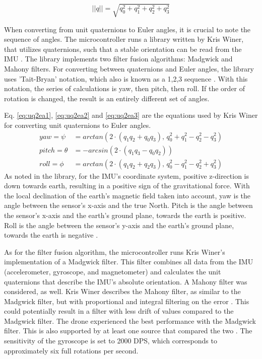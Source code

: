 \begin{equation} \label{eq:normquaternion}
    ||q|| = \sqrt{q_0^2 + q_1^2 + q_2^2 + q_3^2}
\end{equation}

When converting from unit quaternions to Euler angles, it is crucial to note the sequence of angles. The microcontroller runs a library written by Kris Winer, that utilizes quaternions, such that a stable orientation can be read from the IMU \cite{kriswinermpu9250}. The library implements two filter fusion algorithms: Madgwick and Mahony filters. For converting between quaternions and Euler angles, the library uses 'Tait-Bryan' notation, which also is known as a 1,2,3 sequence \cite{JamesDiebelQuaternions}.
With this notation, the series of calculations is yaw, then pitch, then roll. If the order of rotation is changed, the result is an entirely different set of angles. 

Eq. \ref{eq:uq2ea1}, \ref{eq:uq2ea2} and \ref{eq:uq2ea3} are the equations used by Kris Winer for converting unit quaternions to Euler angles. 
\begin{align} \label{eq:uq2ea1}
      yaw = \psi &= arctan\left(2\cdot (q_1 q_2 + q_0 q_3), \, q_0^2 + q_1^2 - q_2^2 - q_3^2    \right)\\\label{eq:uq2ea2}
    pitch = \theta &= -arcsin\left(  2\cdot(q_1 q_3 -q_0 q_2)   \right)\\
     roll = \phi &= arctan\left( 2\cdot (q_1 q_2 +q_2 q_3), \, q_0^2 -q_1^2 -q_2^2 +q_3^2 \right)\label{eq:uq2ea3}
\end{align}
As noted in the library, for the IMU's coordinate system, positive z-direction is down towards earth, resulting in a positive sign of the gravitational force. With the local declination of the earth's magnetic field taken into account, yaw is the angle between the sensor's x-axis and the true North. 
Pitch is the angle between the sensor's x-axis and the earth's ground plane, towards the earth is positive. Roll is the angle between the sensor's y-axis and the earth's ground plane, towards the earth is negative \cite{kriswinermpu9250}.

As for the filter fusion algorithm, the microcontroller runs Kris Winer's implementation of a Madgwick filter. This filter combines all data from the IMU (accelerometer, gyroscope, and magnetometer) and calculates the unit quaternions that describe the IMU's absolute orientation. 
A Mahony filter was considered, as well. Kris Winer describes the Mahony filter, as similar to the Madgwick filter, but with proportional and integral filtering on the error \cite{quaternionFilters}. This could potentially result in a filter with less drift of values compared to the Madgwick filter. The drone experienced the best performance with the Madgwick filter. This is also supported by at least one source that compared the two \cite{madgwickvsmahony}. The sensitivity of the gyroscope is set to 2000 DPS, which corresponds to approximately six full rotations per second. 

